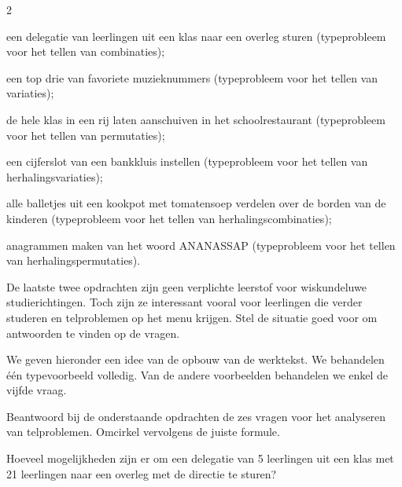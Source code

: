 \begin{multicols}{2}
\begin{nummering}
\item een delegatie van leerlingen uit een  klas naar een overleg sturen (typeprobleem voor het tellen van combinaties);
\item een top drie van favoriete muzieknummers (typeprobleem voor het tellen van variaties);
\item de hele klas in een rij laten aanschuiven in het schoolrestaurant (typeprobleem voor het tellen van permutaties);
\item een cijferslot van een bankkluis instellen (typeprobleem voor het tellen van herhalingsvariaties);
\item alle balletjes uit een kookpot met tomatensoep verdelen over de borden van de kinderen (typeprobleem voor het tellen van herhalingscombinaties);
\item anagrammen maken van het woord ANANASSAP (typeprobleem voor het tellen van herhalingspermutaties).
\end{nummering}

De laatste twee opdrachten zijn geen verplichte leerstof voor wiskundeluwe studierichtingen. Toch zijn ze interessant vooral voor leerlingen die verder studeren en telproblemen op het menu krijgen. Stel de situatie goed voor om antwoorden te vinden op de vragen.

We geven hieronder een idee van de opbouw van de werktekst. We behandelen één typevoorbeeld volledig. Van de andere voorbeelden behandelen we enkel de vijfde vraag.

\end{multicols}


Beantwoord bij de onderstaande opdrachten de zes vragen voor het analyseren van telproblemen. Omcirkel vervolgens de juiste formule.


Hoeveel mogelijkheden zijn er om een delegatie van 5 leerlingen uit een klas met 21 leerlingen naar een overleg met de directie te sturen?

